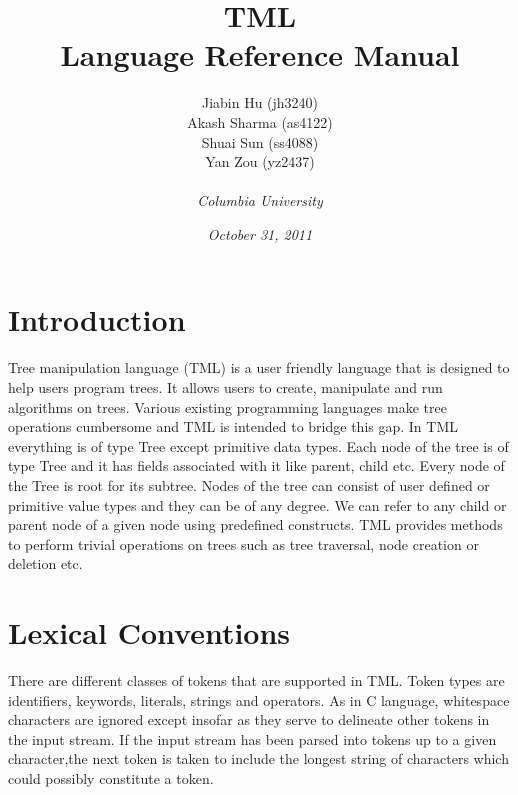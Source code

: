 \documentclass[12pt,psfig,a4]{article}
\begin{document}
 
\pagestyle{plain} 
\newenvironment{code}
{\sffamily
 \setlength{\parskip}{0pt}
}
{}

\title{\vspace{2in}\textbf{TML\\Language Reference Manual}}
\author{
Jiabin Hu (jh3240)\\
Akash Sharma (as4122)\\
Shuai Sun (ss4088)\\
Yan Zou (yz2437)\\\\
\textit{Columbia University}
}
\date{\textit{October 31, 2011}}
\maketitle

\pagebreak
\tableofcontents





\pagebreak


\section{Introduction}

Tree manipulation language (TML) is a user friendly language that is designed to help users program trees. It allows users to create, manipulate and run algorithms on trees. Various existing programming languages make tree operations cumbersome and TML is intended to bridge this gap. In TML everything is of type Tree except primitive data types. Each node of the tree is of type Tree and it has fields associated with it like parent, child etc. Every node of the Tree is root for its subtree. Nodes of the tree can consist of user defined or primitive value types and they can be of any degree. We can refer to any child or parent node of a given node using predefined constructs. TML provides methods to perform trivial operations on trees such as tree traversal, node creation or deletion etc.

\section{Lexical Conventions} \label{lexCon}
There are different classes of tokens that are supported in TML. Token types are identifiers, keywords, literals, strings and operators. As in C language, whitespace characters are ignored except insofar as they serve to delineate other tokens in the input stream. If the input stream has been parsed into tokens up to a given character,the next token is taken to include the longest string of characters which could possibly constitute a token.
\end{document}
